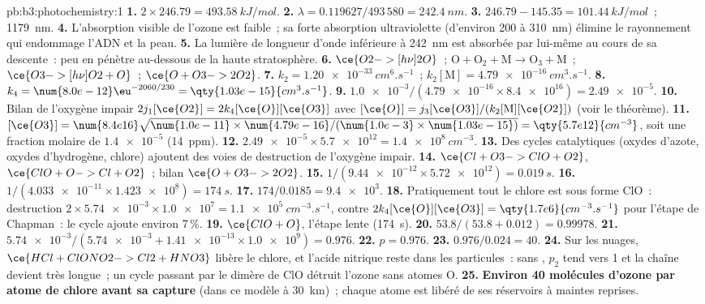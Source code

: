 \begin{solution}{pb:b3:photochemistry:1}
\textbf{1.} $2 \times 246.79 = \qty{493.58}{kJ/mol}$.
\textbf{2.} $\lambda = 0.119627/493\,580 = \qty{242.4}{nm}$.
\textbf{3.} $246.79 - 145.35 = \qty{101.44}{kJ/mol}$~; \qty{1179}{nm}.
\textbf{4.} L'absorption visible de l'ozone est faible~; sa forte
absorption ultraviolette (d'environ 200 à \qty{310}{nm}) élimine le
rayonnement qui endommage l'ADN et la peau.
\textbf{5.} La lumière de longueur d'onde inférieure à \qty{242}{nm} est
absorbée par  lui-même au cours de sa descente~: peu en pénètre
au-dessous de la haute stratosphère.
\textbf{6.} $\ce{O2 ->[h\nu] 2 O}$~; $\mathrm{O + O_2 + M \to O_3 + M}$~; $\ce{O3 ->[h\nu] O2 + O}$~; $\ce{O + O3 -> 2 O2}$.
\textbf{7.} $k_2 = \qty{1.20e-33}{cm^6.s^{-1}}$~; $k_2[\mathrm M] = \qty{4.79e-16}{cm^3.s^{-1}}$.
\textbf{8.} $k_4 = \num{8.0e-12}\eu^{-2060/230} = \qty{1.03e-15}{cm^3.s^{-1}}$.
\textbf{9.} $\num{1.0e-3}/(\num{4.79e-16} \times \num{8.4e16}) = \num{2.49e-5}$.
\textbf{10.} Bilan de l'oxygène impair $2j_1[\ce{O2}] = 2k_4[\ce{O}][\ce{O3}]$ avec $[\ce{O}] = j_3[\ce{O3}]/(k_2[\mathrm M][\ce{O2}])$
(voir le théorème).
\textbf{11.} $[\ce{O3}] = \num{8.4e16}\sqrt{\num{1.0e-11} \times \num{4.79e-16}/(\num{1.0e-3} \times \num{1.03e-15})} =
\qty{5.7e12}{cm^{-3}}$, soit une fraction molaire de $\num{1.4e-5}$ (\qty{14}{ppm}).
\textbf{12.} $\num{2.49e-5} \times \num{5.7e12} = \qty{1.4e8}{cm^{-3}}$.
\textbf{13.} Des cycles catalytiques (oxydes d'azote, oxydes d'hydrogène,
chlore) ajoutent des voies de destruction de l'oxygène impair.
\textbf{14.} $\ce{Cl + O3 -> ClO + O2}$, $\ce{ClO + O -> Cl + O2}$~; bilan $\ce{O + O3 -> 2 O2}$.
\textbf{15.} $1/(\num{9.44e-12} \times \num{5.72e12}) = \qty{0.019}{s}$.
\textbf{16.} $1/(\num{4.033e-11} \times \num{1.423e8}) = \qty{174}{s}$.
\textbf{17.} $174/0.0185 = \num{9.4e3}$.
\textbf{18.} Pratiquement tout le chlore est sous forme ClO~: destruction
$2 \times \num{5.74e-3} \times \num{1.0e7} = \qty{1.1e5}{cm^{-3}.s^{-1}}$,
contre $2k_4[\ce{O}][\ce{O3}] = \qty{1.7e6}{cm^{-3}.s^{-1}}$ pour l'étape
de Chapman~: le cycle ajoute environ 7\,\%.
\textbf{19.} $\ce{ClO + O}$, l'étape lente (\qty{174}{s}).
\textbf{20.} $53.8/(53.8 + 0.012) = 0.99978$.
\textbf{21.} $\num{5.74e-3}/(\num{5.74e-3} + \num{1.41e-13} \times \num{1.0e9}) = 0.976$.
\textbf{22.} $p = 0.976$.
\textbf{23.} $0.976/0.024 = 40$.
\textbf{24.} Sur les nuages, $\ce{HCl + ClONO2 -> Cl2 + HNO3}$ libère le
chlore, et l'acide nitrique reste dans les particules~: sans ,
$p_2$ tend vers 1 et la chaîne devient très longue~; un cycle passant par
le dimère de ClO détruit l'ozone sans atomes O.
\textbf{25.} \textbf{Environ 40 molécules d'ozone par atome de chlore avant
sa capture} (dans ce modèle à \qty{30}{km})~; chaque atome est libéré de
ses réservoirs à maintes reprises.
\end{solution}
